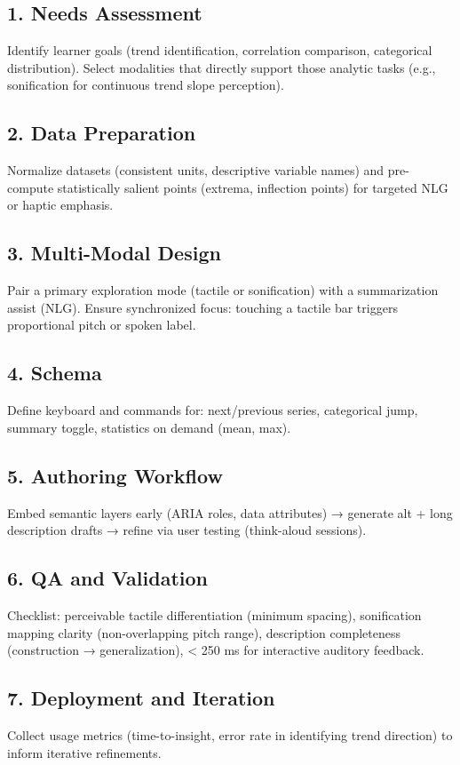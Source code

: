 \subsection*{1. Needs Assessment}
Identify learner goals (trend identification, correlation comparison, categorical distribution). Select modalities that directly support those analytic tasks (e.g., sonification for continuous trend slope perception).
\subsection*{2. Data Preparation}
Normalize datasets (consistent units, descriptive variable names) and pre-compute statistically salient points (extrema, inflection points) for targeted NLG or haptic emphasis.
\subsection*{3. Multi-Modal Design}
Pair a primary exploration mode (tactile or sonification) with a summarization assist (NLG). Ensure synchronized focus: touching a tactile bar triggers proportional pitch or spoken label.
\subsection*{4.  Schema}
Define keyboard and  commands for: next/previous series, categorical jump, summary toggle, statistics on demand (mean, max).
\subsection*{5. Authoring Workflow}
Embed semantic layers early (ARIA roles, data attributes) → generate alt + long description drafts → refine via user testing (think-aloud sessions).
\subsection*{6. QA and Validation}
Checklist: perceivable tactile differentiation (minimum spacing), sonification mapping clarity (non-overlapping pitch range), description completeness (construction → generalization),  < 250 ms for interactive auditory feedback.
\subsection*{7. Deployment and Iteration}
Collect usage metrics (time-to-insight, error rate in identifying trend direction) to inform iterative refinements.

